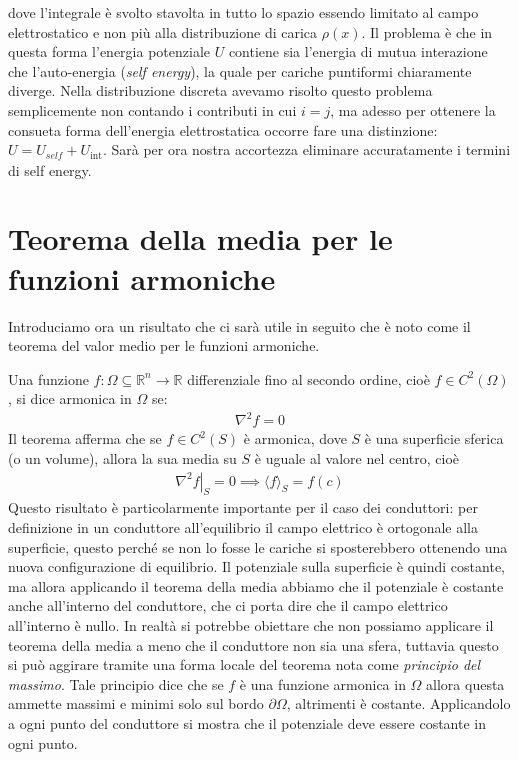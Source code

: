 dove l'integrale è svolto stavolta in tutto lo spazio essendo limitato al campo elettrostatico e non più alla distribuzione di carica $ \rho(x) $.
Il problema è che in questa forma l'energia potenziale $ U $ contiene sia l'energia di mutua interazione che l'auto-energia (\textit{self energy}), 
la quale per cariche puntiformi chiaramente diverge. Nella distribuzione discreta avevamo risolto questo problema semplicemente non contando i contributi 
in cui $ i = j $, ma adesso per ottenere la consueta forma dell'energia elettrostatica occorre fare una distinzione: 
$ U = U_{\textit{self}} + U_{\text{int}} $. Sarà per ora nostra accortezza eliminare accuratamente i termini di self energy.

\section{Teorema della media per le funzioni armoniche}
Introduciamo ora un risultato che ci sarà utile in seguito che è noto come il teorema del valor medio per le funzioni armoniche. 

Una funzione $ f :\Omega \subseteq \mathbb{R}^n \to \mathbb{R} $ differenziale fino al secondo ordine, cioè $ f \in C^2(\Omega) $, si dice armonica 
in $ \Omega $ se:
\begin{align}
  \nabla^2f = 0
\end{align}
Il teorema afferma che se $ f \in C^2(S) $ è armonica, dove $ S $ è una superficie sferica (o un volume), allora la sua media su $ S $ è uguale al valore 
nel centro, cioè
\begin{align}
  \left. \nabla^2 f \right|_S = 0 \implies \langle f \rangle_S = f(c)
\end{align}
Questo risultato è particolarmente importante per il caso dei conduttori: per definizione in un conduttore all'equilibrio il campo elettrico è ortogonale 
alla superficie, questo perché se non lo fosse le cariche si sposterebbero ottenendo una nuova configurazione di equilibrio. Il potenziale sulla superficie 
è quindi costante, ma allora applicando il teorema della media abbiamo che il potenziale è costante anche all'interno del conduttore, che ci porta dire che 
il campo elettrico all'interno è nullo. In realtà si potrebbe obiettare che non possiamo applicare il teorema della media a meno che il conduttore non sia 
una sfera, tuttavia questo si può aggirare tramite una forma locale del teorema nota come \textit{principio del massimo}. Tale principio dice che se $ f $ 
è una funzione armonica in $ \Omega $ allora questa ammette massimi e minimi solo sul bordo $ \partial\Omega $, altrimenti è costante. Applicandolo a ogni 
punto del conduttore si mostra che il potenziale deve essere costante in ogni punto.

